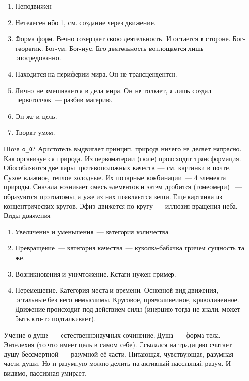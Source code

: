 \begin{enumerate}
	\item Неподвижен
	\item Нетелесен ибо 1, см. создание через движение. 
	\item Форма форм. Вечно созерцает свою деятельность. И остается в стороне. Бог-теоретик. Бог-ум. Бог-нус. Его деятельность воплощается лишь опосредованно. 
	\item Находится на периферии мира. Он не трансцендентен.
	\item Лично не вмешивается в дела мира. Он не толкает, а лишь создал первотолчок~--- разбив материю. 
	\item Он же и цель. 
	\item Творит умом. 
\end{enumerate}

Шоза \texttt{o\_O}?
Аристотель выдвигает принцип: природа ничего не делает напрасно. Как организуется природа. Из первоматерии (гюле) происходит трансформация. Обособляются две пары противоположных качеств~--- см. картинки в почте. Сухое влажное, теплое холодные. Их попарные комбинации~--- 4 элемента природы. Сначала возникает смесь элементов и затем дробится (гомеомери) ~--- образуются протоатомы, а уже из них появляются вещи. 
Еще картинка из концентрических кругов. Эфир движется по кругу~--- иллюзия вращения неба. 
Виды движения

\begin{enumerate}
	\item Увеличение и уменьшения~--- категория количества
	\item Превращение~--- категория качества~--- куколка-бабочка причем сущность та же. 
	\item Возникновения и уничтожение. Кстати нужен пример. 
	\item Перемещение. Категория места и времени. Основной вид движения, остальные без него немыслимы. Круговое, прямолинейное, криволинейное. Движение происходит под действием силы (инерцию тогда не знали, может быть кто-то подталкивает). 
\end{enumerate}

Учение о душе~--- естественнонаучных сочинение. Душа~--- форма тела. Энтелехия (то что имеет цель в самом себе). Ссылался на традицию считает душу бессмертной~--- разумной её части. Питающая, чувствующая, разумная части души. Но и разумную можно делить на активный пассивный разум. И видимо, пассивная умирает. 
 